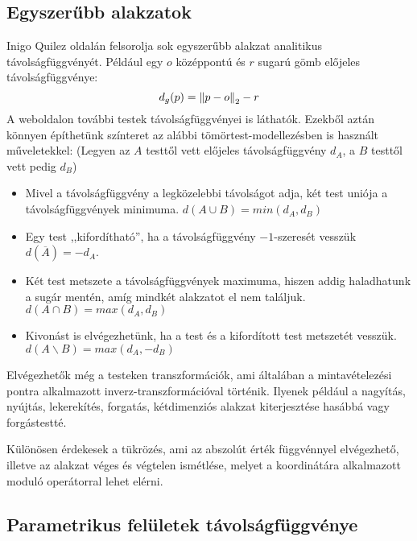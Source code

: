 \subsection{Egyszerűbb alakzatok}
Inigo Quilez oldalán \cite{QuilezDistanceFunctions} felsorolja sok egyszerűbb alakzat analitikus távolságfüggvényét. Például egy $o$ középpontú és $r$ sugarú gömb előjeles távolságfüggvénye:
$$ d_{g}(p) = \norm{p-o}_2 - r $$
A weboldalon további testek távolságfüggvényei is láthatók. Ezekből aztán könnyen építhetünk színteret az alábbi tömörtest-modellezésben is használt műveletekkel: (Legyen az $A$ testtől vett előjeles távolságfüggvény $d_A$, a $B$ testtől vett pedig $d_B$)

\begin{itemize}
	\item Mivel a távolságfüggvény a legközelebbi távolságot adja, két test uniója a távolságfüggvények minimuma. $d(A\cup B) = min(d_A, d_B)$
	\item  Egy test ,,kifordítható'', ha a távolságfüggvény $-1$-szeresét vesszük $d\left(\overline{A}\right) = -d_A$.
	\item Két test metszete a távolságfüggvények maximuma, hiszen addig haladhatunk a sugár mentén, amíg mindkét alakzatot el nem találjuk. $d(A\cap B) = max(d_A, d_B)$
	\item Kivonást is elvégezhetünk, ha a test és a kifordított test metszetét vesszük. $d(A\backslash B) = max(d_A,-d_B)$ 
\end{itemize}

Elvégezhetők még a testeken transzformációk, ami általában a mintavételezési pontra alkalmazott inverz-transzformációval történik. Ilyenek például a nagyítás, nyújtás, lekerekítés, forgatás, kétdimenziós alakzat kiterjesztése hasábbá vagy forgástestté.

Különösen érdekesek a tükrözés, ami az abszolút érték függvénnyel elvégezhető, illetve az alakzat véges és végtelen ismétlése, melyet a koordinátára alkalmazott moduló operátorral lehet elérni. \cite{QuilezDistanceFunctions}


\subsection{Parametrikus felületek távolságfüggvénye}

